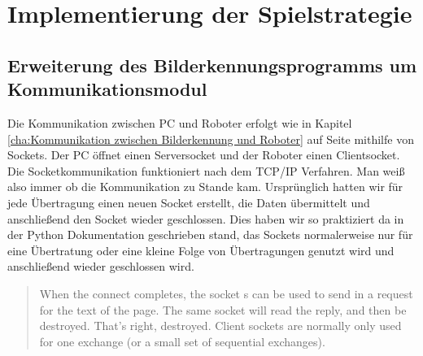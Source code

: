
\chapter{Implementierung der Spielstrategie}
\section{Erweiterung des Bilderkennungsprogramms um Kommunikationsmodul}
Die Kommunikation zwischen PC und Roboter erfolgt wie in Kapitel \ref{cha:Kommunikation zwischen Bilderkennung und Roboter} auf Seite \pageref{cha:Kommunikation zwischen Bilderkennung und Roboter} mithilfe von Sockets. Der PC öffnet einen Serversocket und der Roboter einen Clientsocket. Die Socketkommunikation funktioniert nach dem TCP/IP Verfahren. Man weiß also immer ob die Kommunikation zu Stande kam.
Ursprünglich hatten wir für jede Übertragung einen neuen Socket erstellt, die Daten übermittelt und anschließend den Socket wieder geschlossen. Dies haben wir so praktiziert da in der Python Dokumentation geschrieben stand, das Sockets normalerweise nur für eine Übertratung oder eine kleine Folge von Übertragungen genutzt wird und anschließend wieder geschlossen wird.
\begin{quote}
When the connect completes, the socket s can be used to send in a request for the text of the page. The same socket will read the reply, and then be destroyed. That’s right, destroyed. Client sockets are normally only used for one exchange (or a small set of sequential exchanges).\cite{Python-Doku}
\end{quote}
